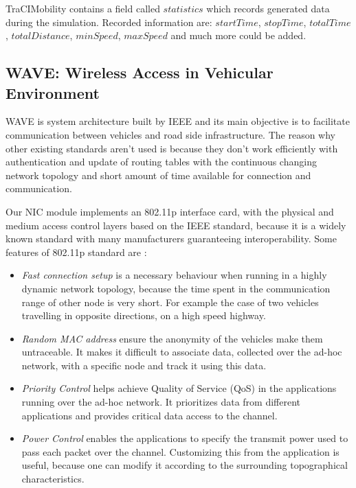 TraCIMobility contains a field called $statistics$ which records generated data
during the simulation. Recorded information are: $startTime$, $stopTime$,
$totalTime$, $totalDistance$, $minSpeed$, $maxSpeed$ and much more could be
added.

\subsection{WAVE: Wireless Access in Vehicular Environment}

WAVE is system architecture built by IEEE and its main objective is to
facilitate communication between vehicles and road side infrastructure. The
reason why other existing standards aren't used is because they don't work
efficiently with authentication and update of routing tables with the continuous
changing network topology and short amount of time available for connection and
communication.

Our NIC module implements an 802.11p interface card, with the physical and
medium access control layers based on the IEEE standard, because it is a widely
known standard with many manufacturers guaranteeing interoperability. Some
features of 802.11p standard are \cite{phule2012public}:
 
\begin{itemize}
  \item {\it Fast connection setup} is a necessary behaviour when running in a
  highly dynamic network topology, because the time spent in the communication
  range of other node is very short. For example the case of two vehicles
  travelling in opposite directions, on a high speed highway.
  \item {\it Random MAC address} ensure the anonymity of the vehicles make them
  untraceable. It makes it difficult to associate data, collected over the
  ad-hoc network, with a specific node and track it using this data.
  \item {\it Priority Control} helps achieve Quality of Service (QoS) in the
  applications running over the ad-hoc network. It prioritizes data from
  different applications and provides critical data access to the channel.
  \item{\it Power Control} enables the applications to specify the transmit
  power used to pass each packet over the channel. Customizing this from the
  application is useful, because one can modify it according to the surrounding
  topographical characteristics.
\end{itemize}



